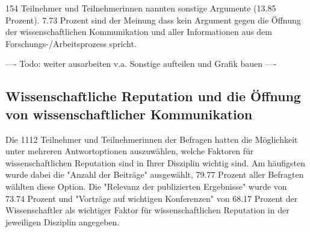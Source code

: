 154 Teilnehmer und Teilnehmerinnen nannten sonstige Argumente (13.85 Prozent). 7.73 Prozent sind der Meinung dass kein Argument gegen die Öffnung der wissenschaftlichen Kommunikation und aller Informationen aus dem Forschungs-/Arbeitsprozess spricht.

---- Todo: weiter ausarbeiten v.a. Sonstige aufteilen und Grafik bauen ----

\subsection{Wissenschaftliche Reputation und die Öffnung von wissenschaftlicher Kommunikation}

Die 1112 Teilnehmer und Teilnehmerinnen der Befragen hatten die Möglichkeit unter mehreren Antwortoptionen auszuwählen, welche Faktoren für wissenschaftlichen Reputation sind in Ihrer Disziplin wichtig sind. Am häufigsten wurde dabei die "Anzahl der Beiträge" ausgewählt, 79.77 Prozent aller Befragten wählten diese Option. Die "Relevanz der publizierten Ergebnisse" wurde von 73.74 Prozent und "Vorträge auf wichtigen Konferenzen" von 68.17 Prozent der Wissenschaftler als wichtiger Faktor für wissenschaftlichen Reputation in der jeweiligen Disziplin angegeben.

